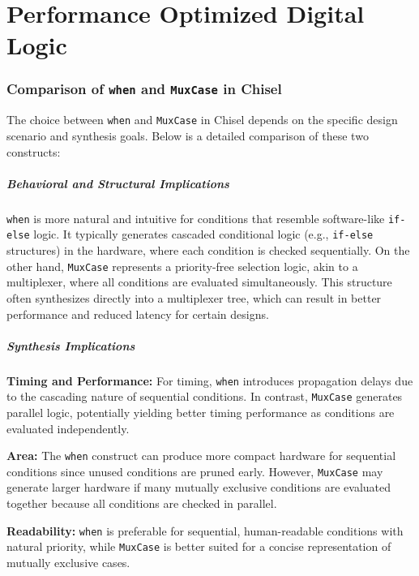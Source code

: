 \chapter{Performance Optimized Digital Logic}\label{chapt:perf_digital_logic}
\localtoc

\subsection{Comparison of \texttt{when} and \texttt{MuxCase} in Chisel} \label{sec:muxcase}

The choice between \texttt{when} and \texttt{MuxCase} in Chisel depends on the specific design scenario and synthesis goals. Below is a detailed comparison of these two constructs:

\paragraph{Behavioral and Structural Implications}
\texttt{when} is more natural and intuitive for conditions that resemble software-like \texttt{if-else} logic. It typically generates cascaded conditional logic (e.g., \texttt{if-else} structures) in the hardware, where each condition is checked sequentially. On the other hand, \texttt{MuxCase} represents a priority-free selection logic, akin to a multiplexer, where all conditions are evaluated simultaneously. This structure often synthesizes directly into a multiplexer tree, which can result in better performance and reduced latency for certain designs.

\paragraph{Synthesis Implications}
\textbf{Timing and Performance:}  
For timing, \texttt{when} introduces propagation delays due to the cascading nature of sequential conditions. In contrast, \texttt{MuxCase} generates parallel logic, potentially yielding better timing performance as conditions are evaluated independently.

\textbf{Area:}  
The \texttt{when} construct can produce more compact hardware for sequential conditions since unused conditions are pruned early. However, \texttt{MuxCase} may generate larger hardware if many mutually exclusive conditions are evaluated together because all conditions are checked in parallel.

\textbf{Readability:}  
\texttt{when} is preferable for sequential, human-readable conditions with natural priority, while \texttt{MuxCase} is better suited for a concise representation of mutually exclusive cases.


